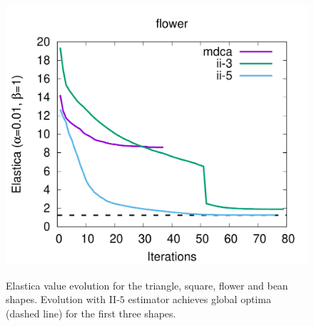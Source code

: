 \begin{figure}[h!]
{\includegraphics[scale=0.4]{figures/chapter5/exhaustive-selection/plot-shape-estimator/flower.pdf}
}\hspace{1em}%
%
\caption{Elastica value evolution for the triangle, square, flower and bean shapes. Evolution with II-$5$ estimator achieves global optima (dashed line) for the first three shapes.}
\label{fig:local-comb-plots}
\end{figure}

